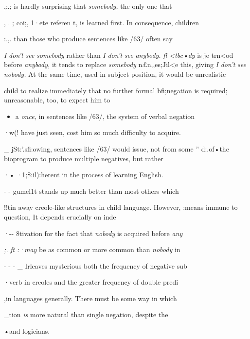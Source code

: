 ,:.; is hardly surprising that \textit{somebo}\textit{d}\textit{y,} the only one that

, . ; coi;, 1·ete referen t, is learned first. In consequence, children

:.,. than those who produce sentences like /63/ often say

\textit{I} \textit{don't} \textit{see} \textit{somebo}\textit{d}\textit{y} rather than \textit{I} \textit{don't} \textit{see} \textit{anybody.} \textit{fl} \textit{{\textless}tbc•dy} is je trn{\textless}od before \textit{anybody,} it tends to replace \textit{somebo}\textit{d}\textit{y} n£n,,es;Jil{\textless}e this, giving \textit{I} \textit{don't} \textit{see nobody.} At the same time, used in subject position, it would be unrealistic

child to realize immediately that no further formal bfi;negation is required; unreasonable, too, to expect him to

\begin{itemize}
\item a \textit{once,} in sentences like /63/, the system of verbal negation
\end{itemize}

·w(! have just seen, cost him so much difficulty to acquire.

\_ jSt:'.sfi:owing, sentences like /63/ would issue, not from some '' d:.of•the bioprogram to produce multiple negatives, but rather

·• ·1;\$:il):herent in the process of learning English.

{}- {}- gumel1t stands up much better than most others which

!!tin away creole-like structures in child language. However,
:means immune to question, It depends crucially on inde\-

·{}-{}- 8tivation for the fact that \textit{nobody }is acquired before \textit{any\-}

\textit{;.} \textit{ft} \textit{:}\textit{·}\textit{may} be as common or more common than \textit{nobo}\textit{d}\textit{y} in

{}- {}- {}- \_ Irleaves mysterious both the frequency of negative sub\-

·verb in creoles and the greater frequency of double predi\-

,in languages generally. There must be some way in which

\_tion \textit{is} more natural than single negation, despite the

•and logicians.

